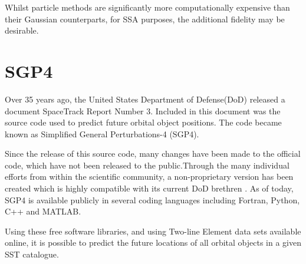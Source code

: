 \documentclass[12pt,openany,a4paper]{book}
\begin{document}
		Whilst particle methods are significantly more computationally expensive than their Gaussian counterparts, for SSA purposes, the additional fidelity may be desirable.
		
	
		


	
		
		\section{SGP4}
		
		Over 35 years ago, the United States Department of Defense(DoD) released a document SpaceTrack Report Number 3\cite{SpaceTrk3}. Included in this document was the source code used to predict future orbital object positions. The code became known as Simplified
		General Perturbations-4 (SGP4). \newline
		
		 Since the release of this source code, many changes have been made to the official code, which have not been released to the public.Through the many individual efforts from within the scientific community, a non-proprietary version has been created which is highly compatible with its current DoD brethren \cite{SpaceTrk3R}. As of today, SGP4 is available publicly in several coding languages including Fortran, Python, C++ and MATLAB. \newline
		 
		 Using these free software libraries, and using Two-line Element data sets available online, it is possible to predict the future locations of all orbital objects in a given SST catalogue.
		
		
\end{document}
